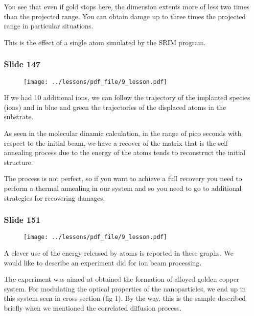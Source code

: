 \documentclass[../main/main.tex]{subfiles}
\begin{document}
You see that even if gold stops here, the dimension extents more of less two times than the projected range.
You can obtain damge up to three times the projected range in particular situations.

This is the effect of a single atom simulated by the SRIM program.

\newpage

\subsubsection{Slide 147}

\begin{figure}[h!]
\centering
\texttt{[image: ../lessons/pdf\_file/9\_lesson.pdf]}
\end{figure}

If we had 10 additional ions, we can follow the trajectory of the implanted species (ions) and in blue and green the trajectories of the displaced atoms in the substrate.

As seen in the molecular dinamic calculation, in the range of pico seconds with respect to the initial beam, we have a recover of the matrix that is the self annealing process due to the energy of the atoms tends to reconstruct the initial structure.

The process is not perfect, so if you want to achieve a full recovery you need to perform a thermal annealing in our system and so you need to go to additional strategies for recovering damages.

\newpage

\subsubsection{Slide 151}

\begin{figure}[h!]
\centering
\texttt{[image: ../lessons/pdf\_file/9\_lesson.pdf]}
\end{figure}

A clever use of the energy released by atoms is reported in these graphs. We would like to describe an experiment did for ion beam processing.

The experiment was aimed at obtained the formation of alloyed golden copper system. For modulating the optical properties of the nanoparticles, we end up in this system seen in cross section (fig 1). By the way, this is the sample described briefly when we mentioned the correlated diffusion process.
\end{document}
